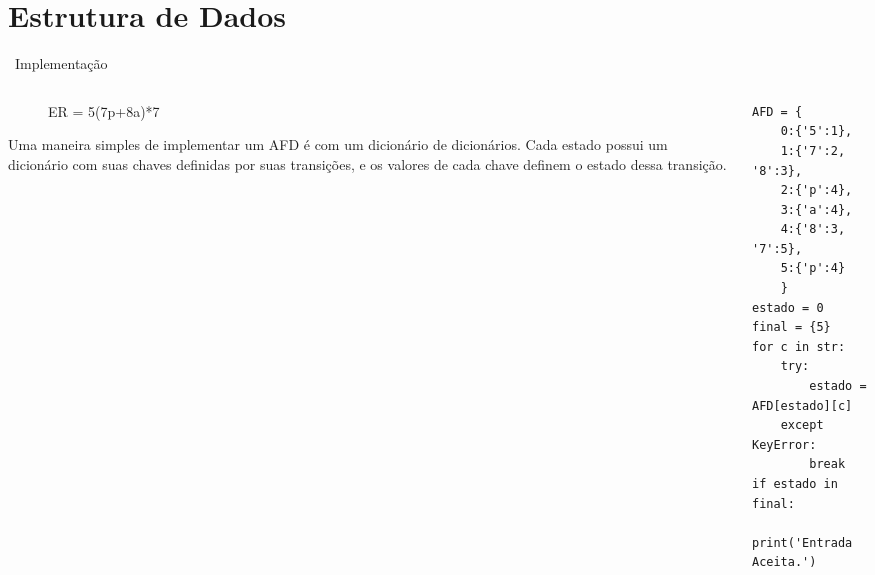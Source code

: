 \documentclass{beamer}
\begin{document}
\section{Estrutura de Dados}
\begin{frame}[fragile]{\raisebox{-0.2\height}{}~Implementação}
\vspace{-10mm}
\begin{columns}[t]
\begin{column}{0.45\textwidth}
   \begin{figure}
      \centering
      \caption{ER = 5(7p+8a)*7}
    \end{figure}
    \small \justifying Uma maneira simples de implementar um AFD é com um dicionário de dicionários. Cada estado possui um dicionário com suas chaves definidas por suas transições, e os valores de cada chave definem o estado dessa transição.
\end{column}
\begin{column}{0.45\textwidth}
\begin{verbatim}
AFD = {
    0:{'5':1},
    1:{'7':2, '8':3},
    2:{'p':4},
    3:{'a':4},
    4:{'8':3, '7':5},
    5:{'p':4}
    }
estado = 0
final = {5}
for c in str:
    try:
        estado = AFD[estado][c]
    except KeyError:
        break
if estado in final:
    print('Entrada Aceita.')
\end{verbatim}
\end{column}
\end{columns}
\end{frame}
\end{document}
